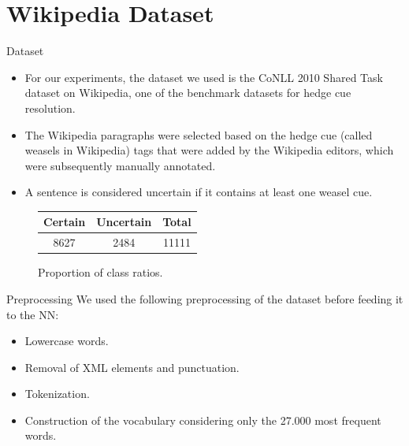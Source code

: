 \documentclass{beamer}
\begin{document}
\section{Wikipedia Dataset}
\begin{frame}{Dataset}
	\begin{itemize}\setlength\itemsep{1em}
		\item For our experiments, the dataset we used is the CoNLL 2010 Shared Task dataset on Wikipedia, one of the benchmark datasets for hedge cue resolution.
		\item The Wikipedia paragraphs were selected based on the hedge cue (called weasels in Wikipedia) tags that were added by the Wikipedia editors, which were subsequently manually annotated.
		\item A sentence is considered uncertain if it contains at least one weasel cue.
	\end{itemize}
	\begin{figure}[htbp]
		\begin{tabular}{|c|c|c|}
			\hline
			\textbf{Certain} & \textbf{Uncertain} & \textbf{Total}\\ 
			\hline
			8627 & 2484 & 11111\\
			\hline
		\end{tabular}
		\caption*{Proportion of class ratios.}
	\end{figure}
\end{frame}
\begin{frame}{Preprocessing}
	We used the following preprocessing of the dataset before feeding it to the NN:
	\begin{itemize}\setlength\itemsep{1em}
		\item Lowercase words.
		\item Removal of XML elements and punctuation.
		\item Tokenization.
		\item Construction of the vocabulary considering only the 27.000 most frequent words.
	\end{itemize}
\end{frame}
\end{document}

